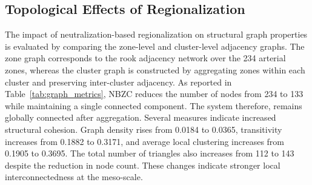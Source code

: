 \documentclass[conference]{IEEEtran}
\begin{document}
\subsection{Topological Effects of Regionalization}
The impact of neutralization-based regionalization on structural graph
properties is evaluated by comparing the zone-level and cluster-level
adjacency graphs. The zone graph corresponds to the rook adjacency network
over the 234 arterial zones, whereas the cluster graph is constructed by
aggregating zones within each cluster and preserving inter-cluster adjacency.
As reported in Table~\ref{tab:graph_metrics}, NBZC reduces the number of nodes
from 234 to 133 while maintaining a single connected component. The system
therefore, remains globally connected after aggregation.
Several measures indicate increased structural cohesion. Graph density rises
from 0.0184 to 0.0365, transitivity increases from 0.1882 to 0.3171, and
average local clustering increases from 0.1905 to 0.3695. The total number of
triangles also increases from 112 to 143 despite the reduction in node count.
These changes indicate stronger local interconnectedness at the meso-scale.
\end{document}
